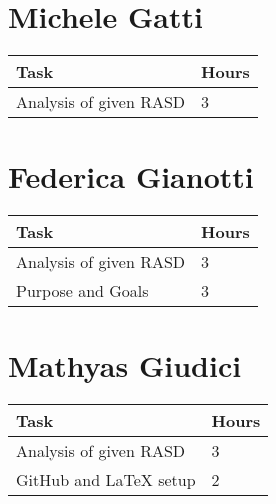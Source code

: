 \section{Michele Gatti}

\:
\begin{center}
\begin{tabular}{ | p{9 cm} | p{3 cm}  |  }
  \hline
    \textbf{Task} & \textbf{Hours }\\ \hline
    Analysis of given RASD & 3 \\ \hline
\end{tabular}
\end{center}
\:


\section{Federica Gianotti}

\:
\begin{center}
\begin{tabular}{ | p{9 cm} | p{3 cm}  |  }
  \hline
    \textbf{Task} & \textbf{Hours }\\ \hline
    Analysis of given RASD & 3 \\ \hline
    Purpose and Goals & 3 \\ \hline
\end{tabular}
\end{center}
\:

\section{Mathyas Giudici}

\:
\begin{center}
\begin{tabular}{ | p{9 cm} | p{3 cm}  |  }
  \hline
    \textbf{Task} & \textbf{Hours }\\ \hline
    Analysis of given RASD & 3 \\ \hline
    GitHub and LaTeX setup & 2 \\ \hline
\end{tabular}
\end{center}

\clearpage
